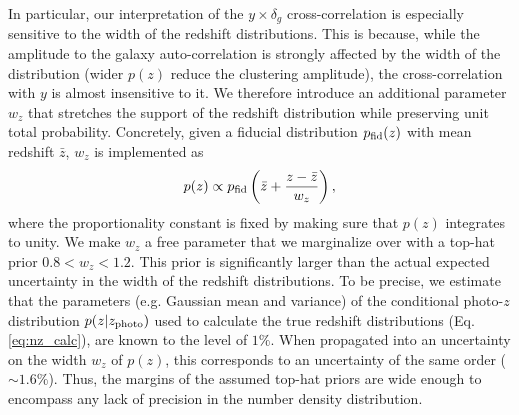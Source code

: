 \documentclass[useAMS,usenatbib]{mn2e}
\begin{document}
      In particular, our interpretation of the $y\times \delta_g$ cross-correlation is especially sensitive to the width of the redshift distributions. This is because, while the amplitude to the galaxy auto-correlation is strongly affected by the width of the distribution (wider $p(z)$ reduce the clustering amplitude), the cross-correlation with $y$ is almost insensitive to it. We therefore introduce an additional parameter $w_z$ that stretches the support of the redshift distribution while preserving unit total probability. Concretely, given a fiducial distribution $p_{\rm fid}(z)$ with mean redshift $\bar{z}$, $w_z$ is implemented as
      \begin{equation}
        p(z)\propto p_{\rm fid}\left(\bar{z}+\frac{z-\bar{z}}{w_z}\right),
      \end{equation}
      where the proportionality constant is fixed by making sure that $p(z)$ integrates to unity. We make $w_z$ a free parameter that we marginalize over with a top-hat prior $0.8<w_z<1.2$. This prior is significantly larger than the actual expected uncertainty in the width of the redshift distributions. To be precise, we estimate that the parameters (e.g. Gaussian mean and variance) of the conditional photo-$z$ distribution $p(z|z_{\rm photo})$ used to calculate the true redshift distributions (Eq. \ref{eq:nz_calc}), are known to the level of $1\%$. When propagated into an uncertainty on the width $w_z$ of $p(z)$, this corresponds to an uncertainty of the same order ($\sim1.6\%$). Thus, the margins of the assumed top-hat priors are wide enough to encompass any lack of precision in the number density distribution.
\end{document}
